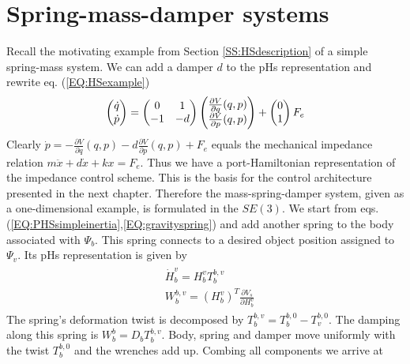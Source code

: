 \documentclass[a4paper,twoside, openright,12pt]{report}
\begin{document}
\section{Spring-mass-damper systems}\label{S:springmassdampers}
Recall the motivating example from Section \ref{SS:HSdescription} of a simple spring-mass system. We can add a damper $d$ to the pHs representation and rewrite eq. (\ref{EQ:HSexample})
\begin{equation}
	\begin{pmatrix}\dot{q} \\ \dot{p}\end{pmatrix} =
	\begin{pmatrix}0 & 1 \\ -1 & -d\end{pmatrix}
	\begin{pmatrix}\frac{\partial V}{\partial q}(q,p) \\ \frac{\partial V}{\partial p}(q,p)\end{pmatrix} + 
	\begin{pmatrix}0 \\ 1\end{pmatrix} F_e\\  
\end{equation}
Clearly $\dot{p} = -\frac{\partial V}{\partial q}(q,p)-d\frac{\partial V}{\partial p}(q,p)+F_e$ equals the mechanical impedance relation $m\ddot{x} + d\dot{x} +kx = F_e$. Thus we have a port-Hamiltonian representation of the impedance control scheme. This is the basis for the control architecture presented in the next chapter. Therefore the mass-spring-damper system, given as a one-dimensional example, is formulated in the $SE(3)$. We start from eqs. (\ref{EQ:PHSsimpleinertia},\ref{EQ:gravityspring}) and add another spring to the body associated with $\Psi_b$. This spring connects to a desired object position assigned to $\Psi_v$. Its pHs representation is given by
\begin{eqnarray}
\begin{aligned}
	&\dot{H}_b^v = H_b^v T_b^{b,v}\\
	&W_b^{b,v} = (H_b^v)^T\frac{\partial V_{s}}{\partial H_b^v}
\end{aligned}
\end{eqnarray}
The spring's deformation twist is decomposed by $T_b^{b,v} = T_b^{b,0} - T_v^{b,0}$.
The damping along this spring is $W_b^b = D_b T_b^{b,v} $. Body, spring and damper move uniformly with the twist $T_b^{b,0}$ and the wrenches add up. Combing all components we arrive at
\end{document}
